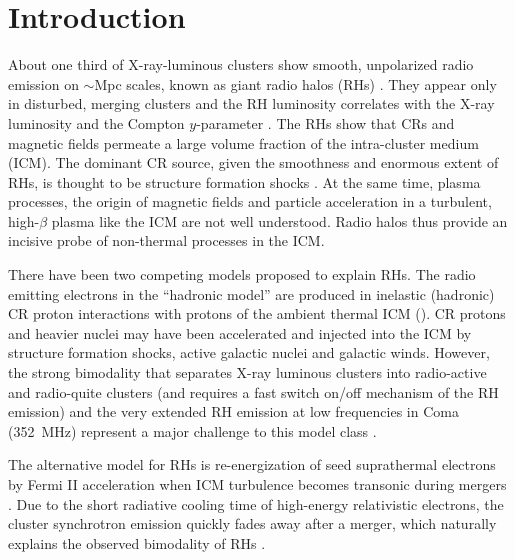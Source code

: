 \documentclass[useAMS,usenatbib]{mn2e}
\begin{document}
\section{Introduction}
About one third of X-ray-luminous clusters show smooth, unpolarized
radio emission on $\sim$Mpc scales, known as giant radio halos (RHs)
\citep{2014IJMPD..2330007B}. They appear only in disturbed, merging
clusters and the RH luminosity correlates with the X-ray luminosity
\citep{2001A&A...369..441G,2012A&ARv..20...54F} and the Compton
$y$-parameter \citep{2013A&A...554A.140P}. The RHs show that CRs and
magnetic fields permeate a large volume fraction of the intra-cluster
medium (ICM). The dominant CR source, given the smoothness and
enormous extent of RHs, is thought to be structure formation shocks
\citep{miniati01,pfrommer08}. At the same time, plasma processes, the
origin of magnetic fields and particle acceleration in a turbulent,
high-$\beta$ plasma like the ICM are not well understood. Radio halos
thus provide an incisive probe of non-thermal processes in the ICM.

There have been two competing models proposed to explain RHs.  The
radio emitting electrons in the ``hadronic model'' are produced in
inelastic (hadronic) CR proton interactions with protons of the
ambient thermal ICM
(\citealp{1980ApJ...239L..93D,1999APh....12..169B,2001ApJ...562..233M,
  2004A&A...413...17P,2008MNRAS.385.1211P,ensslin11}). CR protons and
heavier nuclei may have been accelerated and injected into the ICM by
structure formation shocks, active galactic nuclei and galactic
winds. However, the strong bimodality that separates X-ray luminous
clusters into radio-active and radio-quite clusters (and requires a
fast switch on/off mechanism of the RH emission) and the very extended
RH emission at low frequencies in Coma (352~MHz) represent a major
challenge to this model class \citep{brunetti12,2014MNRAS.438..124Z}.

The alternative model for RHs is re-energization of seed
suprathermal electrons by Fermi II acceleration when ICM turbulence
becomes transonic during mergers
\citep{1987A&A...182...21S,1993ApJ...406..399G,2001MNRAS.320..365B,
  2004MNRAS.350.1174B,brunetti07,brunetti11}. Due to the short
radiative cooling time of high-energy relativistic electrons, the
cluster synchrotron emission quickly fades away after a merger, which
naturally explains the observed bimodality of RHs \cite[see
  e.g.][]{2013MNRAS.429.3564D,2014MNRAS.443.3564D}.
\end{document}
